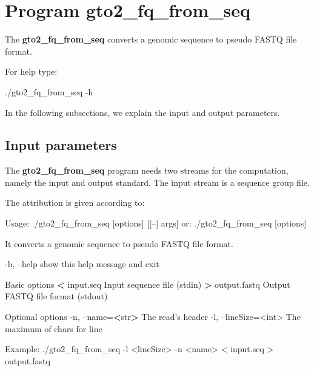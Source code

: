 \documentclass[11pt,]{krantz}
\newenvironment{Shaded}{\begin{snugshade}}{\end{snugshade}}
\newcommand{\StringTok}[1]{\textcolor[rgb]{0.5,0.5,0.5}{#1}}
\newcommand{\OperatorTok}[1]{\textcolor[rgb]{0.43,0.43,0.43}{\textbf{#1}}}
\newcommand{\ExtensionTok}[1]{#1}
\newcommand{\NormalTok}[1]{#1}
\begin{document}
\section{Program gto2\_fq\_from\_seq}\label{program-gto2_fq_from_seq}

The \textbf{gto2\_fq\_from\_seq} converts a genomic sequence to pseudo
FASTQ file format.

For help type:

\begin{Shaded}
\begin{Highlighting}[]
\ExtensionTok{./gto2_fq_from_seq}\NormalTok{ -h}
\end{Highlighting}
\end{Shaded}

In the following subsections, we explain the input and output
parameters.

\subsection*{Input parameters}\label{input-parameters-9}


The \textbf{gto2\_fq\_from\_seq} program needs two streams for the
computation, namely the input and output standard. The input stream is a
sequence group file.

The attribution is given according to:

\begin{Shaded}
\begin{Highlighting}[]
\ExtensionTok{Usage}\NormalTok{: ./gto2_fq_from_seq [options] [[--] args]}
   \ExtensionTok{or}\NormalTok{: ./gto2_fq_from_seq [options]}

\ExtensionTok{It}\NormalTok{ converts a genomic sequence to pseudo FASTQ file format.}

    \ExtensionTok{-h}\NormalTok{, --help            show this help message and exit}

\ExtensionTok{Basic}\NormalTok{ options}
    \OperatorTok{<} \ExtensionTok{input.seq}\NormalTok{           Input sequence file (stdin)}
    \OperatorTok{>} \ExtensionTok{output.fastq}\NormalTok{        Output FASTQ file format (stdout)}

\ExtensionTok{Optional}\NormalTok{ options}
    \ExtensionTok{-n}\NormalTok{, --name=}\OperatorTok{<}\NormalTok{str}\OperatorTok{>}\NormalTok{      The read}\StringTok{'s header}
\StringTok{    -l, --lineSize=<int>  The maximum of chars for line}

\StringTok{Example: ./gto2_fq_from_seq -l <lineSize> -n <name> < }
\StringTok{input.seq > output.fastq}
\end{Highlighting}
\end{Shaded}
\end{document}
